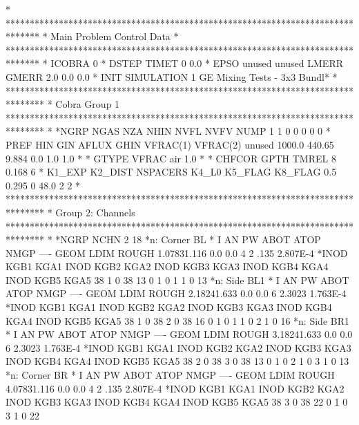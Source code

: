 *
*******************************************************************************
* Main Problem Control Data                                                   *
*******************************************************************************
*       ICOBRA
             0
*        DSTEP         TIMET
             0           0.0
*         EPSO        unused        unused         LMERR         GMERR
           2.0                                       0.0           0.0
*     INIT                                                           SIMULATION
         1                                         GE Mixing Tests - 3x3 Bundl*
*
********************************************************************************
* Cobra Group 1
********************************************************************************
*
*NGRP NGAS  NZA NHIN NVFL NVFV NUMP 
    1    1    0    0    0    0    0
*     PREF       HIN       GIN     AFLUX      GHIN  VFRAC(1)  VFRAC(2)    unused
    1000.0    440.65               9.884       0.0       1.0       1.0          
*
*  GTYPE       VFRAC
air              1.0
*
*   CHFCOR      GPTH     TMREL
         8     0.168         6
*       K1_EXP       K2_DIST      NSPACERS         K4_L0       K5_FLAG       K8_FLAG
           0.5         0.295             0          48.0             2             2
*
********************************************************************************
* Group 2: Channels
********************************************************************************
*
*NGRP NCHN
    2   18
*n: Corner BL
*   I   AN   PW ABOT ATOP NMGP ---- GEOM LDIM     ROUGH
    1.07831.116  0.0  0.0    4         2 .135  2.807E-4
*INOD KGB1 KGA1 INOD KGB2 KGA2 INOD KGB3 KGA3 INOD KGB4 KGA4 INOD KGB5 KGA5
   38    1    0   38   13    0    1    0    1    1    0   13
*n: Side BL1
*   I   AN   PW ABOT ATOP NMGP ---- GEOM LDIM     ROUGH
    2.18241.633  0.0  0.0    6         2.3023  1.763E-4
*INOD KGB1 KGA1 INOD KGB2 KGA2 INOD KGB3 KGA3 INOD KGB4 KGA4 INOD KGB5 KGA5
   38    1    0   38    2    0   38   16    0    1    0    1    1    0    2
    1    0   16
*n: Side BR1
*   I   AN   PW ABOT ATOP NMGP ---- GEOM LDIM     ROUGH
    3.18241.633  0.0  0.0    6         2.3023  1.763E-4
*INOD KGB1 KGA1 INOD KGB2 KGA2 INOD KGB3 KGA3 INOD KGB4 KGA4 INOD KGB5 KGA5
   38    2    0   38    3    0   38   13    0    1    0    2    1    0    3
    1    0   13
*n: Corner BR
*   I   AN   PW ABOT ATOP NMGP ---- GEOM LDIM     ROUGH
    4.07831.116  0.0  0.0    4         2 .135  2.807E-4
*INOD KGB1 KGA1 INOD KGB2 KGA2 INOD KGB3 KGA3 INOD KGB4 KGA4 INOD KGB5 KGA5
   38    3    0   38   22    0    1    0    3    1    0   22
